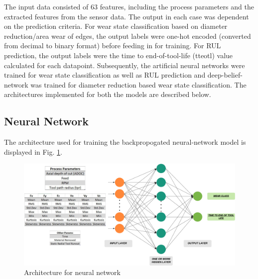 \documentclass[preprint,review,12pt]{elsarticle}
\begin{document}
The input data consisted of $63$ features, including the process parameters and the extracted features from the sensor data. The output in each case was dependent on the prediction criteria. For wear state classification based on diameter reduction/area wear of edges, the output labels were one-hot encoded (converted from decimal to binary format) before feeding in for training. For RUL prediction, the output labels were the time to end-of-tool-life (tteotl) value calculated for each datapoint. Subsequently, the artificial neural networks were trained for wear state classification as well as RUL prediction and deep-belief-network was trained for diameter reduction based wear state classification. The architectures implemented for both the models are described below. \par

\subsection{Neural Network}\label{sec:sec41}

The architecture used for training the backpropogated neural-network model is displayed in Fig. \ref{fig:fig322}. \par

\begin{figure}[!h]
  \begin{center}
    \includegraphics[width=0.9\linewidth]{322.png}
    \caption{Architecture for neural network}\label{fig:fig322}
  \end{center}
\end{figure}
\end{document}
